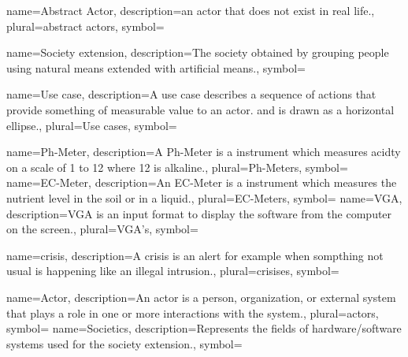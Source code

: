 {name={Abstract Actor},
description={an actor that does not exist in real life.},
plural={abstract actors},
symbol={}
}

{name={Society extension},
description={The society obtained by grouping people using natural means
extended with artificial means.},
symbol={}
}

{name={Use case},
description={A use case describes a sequence of actions that provide something
of measurable value to an actor. and is drawn as a horizontal ellipse.},
plural={Use cases}, 
symbol={} 
}

{name={Ph-Meter},
description={A Ph-Meter is a instrument which measures acidty on a scale of 1
to 12 where 12 is alkaline.}, plural={Ph-Meters},
symbol={}
}
{name={EC-Meter},
description={An EC-Meter is a instrument which measures the nutrient level in
the soil or in a liquid.}, plural={EC-Meters}, symbol={}
}
{name={VGA},
description={VGA is an input format to display the software from the computer
on the screen.}, plural={VGA's}, symbol={} }

{name={crisis},
description={A crisis is an alert for example when sompthing not usual is
happening like an illegal intrusion.}, plural={crisises},
symbol={} }

{name={Actor},
description={An actor is a person, organization, or external system that plays a
role in one or more interactions with the system.},
plural={actors},
symbol={}
}
{name={Societics},
description={Represents the fields of hardware/software
systems used for the society extension.},
symbol={}
}

